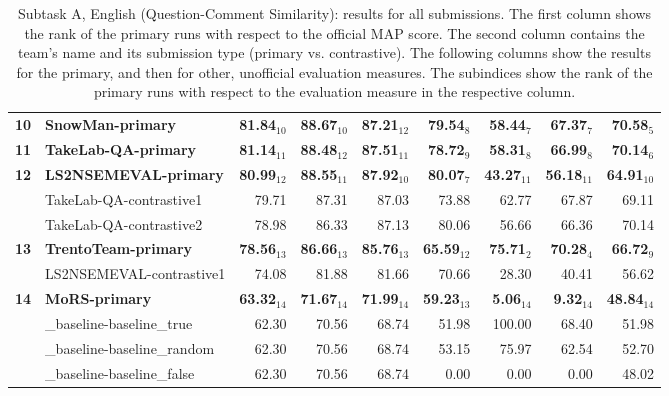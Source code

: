 \begin{table*}[tbh]
\begin{center}
\begin{tabular}{clrrrrrrr}
\bf 10 & \bf SnowMan-primary & \bf 81.84$_{10}$ & \bf \scriptsize 88.67$_{10}$ & \bf \scriptsize 87.21$_{12}$ & \bf \scriptsize 79.54$_{8}$ & \bf \scriptsize 58.44$_{7}$ & \bf \scriptsize 67.37$_{7}$ & \bf \scriptsize 70.58$_{5}$ \\
\bf 11 & \bf TakeLab-QA-primary & \bf 81.14$_{11}$ & \bf \scriptsize 88.48$_{12}$ & \bf \scriptsize 87.51$_{11}$ & \bf \scriptsize 78.72$_{9}$ & \bf \scriptsize 58.31$_{8}$ & \bf \scriptsize 66.99$_{8}$ & \bf \scriptsize 70.14$_{6}$ \\
\bf 12 & \bf LS2NSEMEVAL-primary & \bf 80.99$_{12}$ & \bf \scriptsize 88.55$_{11}$ & \bf \scriptsize 87.92$_{10}$ & \bf \scriptsize 80.07$_{7}$ & \bf \scriptsize 43.27$_{11}$ & \bf \scriptsize 56.18$_{11}$ & \bf \scriptsize 64.91$_{10}$ \\
& TakeLab-QA-contrastive1 & 79.71 & \scriptsize 87.31 & \scriptsize 87.03 & \scriptsize 73.88 & \scriptsize 62.77 & \scriptsize 67.87 & \scriptsize 69.11 \\
& TakeLab-QA-contrastive2 & 78.98 & \scriptsize 86.33 & \scriptsize 87.13 & \scriptsize 80.06 & \scriptsize 56.66 & \scriptsize 66.36 & \scriptsize 70.14 \\
\bf 13 & \bf TrentoTeam-primary & \bf 78.56$_{13}$ & \bf \scriptsize 86.66$_{13}$ & \bf \scriptsize 85.76$_{13}$ & \bf \scriptsize 65.59$_{12}$ & \bf \scriptsize 75.71$_{2}$ & \bf \scriptsize 70.28$_{4}$ & \bf \scriptsize 66.72$_{9}$ \\
& LS2NSEMEVAL-contrastive1 & 74.08 & \scriptsize 81.88 & \scriptsize 81.66 & \scriptsize 70.66 & \scriptsize 28.30 & \scriptsize 40.41 & \scriptsize 56.62 \\
\bf 14 & \bf MoRS-primary & \bf 63.32$_{14}$ & \bf \scriptsize 71.67$_{14}$ & \bf \scriptsize 71.99$_{14}$ & \bf \scriptsize 59.23$_{13}$ & \bf \scriptsize  5.06$_{14}$ & \bf \scriptsize  9.32$_{14}$ & \bf \scriptsize 48.84$_{14}$ \\
& \_baseline-baseline\_true & 62.30 & \scriptsize 70.56 & \scriptsize 68.74 & \scriptsize 51.98 & \scriptsize 100.00 & \scriptsize 68.40 & \scriptsize 51.98 \\
& \_baseline-baseline\_random & 62.30 & \scriptsize 70.56 & \scriptsize 68.74 & \scriptsize 53.15 & \scriptsize 75.97 & \scriptsize 62.54 & \scriptsize 52.70 \\
& \_baseline-baseline\_false & 62.30 & \scriptsize 70.56 & \scriptsize 68.74 & \scriptsize  0.00 & \scriptsize  0.00 & \scriptsize  0.00 & \scriptsize 48.02 \\
\end{tabular}
\caption{Subtask A, English (Question-Comment Similarity): results for all submissions. The first column shows the rank of the primary runs with respect to the official MAP score. The second column contains the team's name and its submission type (primary vs. contrastive).
The following columns show the results for the primary, and then for other, unofficial evaluation measures. The subindices show the rank of the primary runs with respect to the evaluation measure in the respective column.}
\label{table:results}
\end{center}
\end{table*}
